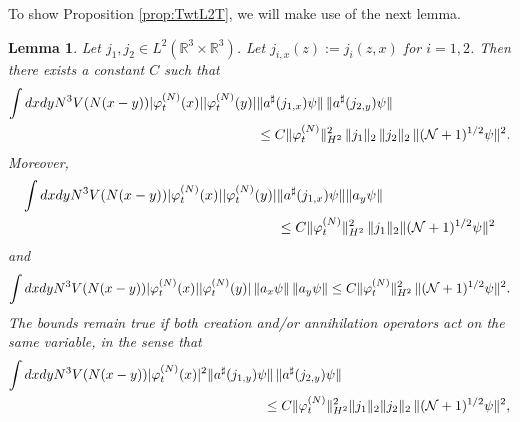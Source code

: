 \documentclass[11pt,a4paper]{article}
\newtheorem{lemma}[thm]{Lemma}
\newcommand{\bR}{{\mathbb R}}
\newcommand{\cN}{{\cal N}}
\begin{document}
To show Proposition \ref{prop:TwtL2T}, we will make use of the next lemma.
\begin{lemma}\label{lm:2b}
Let $j_1, j_2 \in L^2 (\bR^3 \times \bR^3)$. Let $j_{i,x} (z) := j_i (z,x)$ for $i=1,2$. Then there exists a constant $C$ such that 
\begin{equation}\label{eq:lm2b-1}  
\begin{split}
\int dx dy N^3 V(N (x-y)) |\varphi_t^{(N)} (x)| |\varphi_t^{(N)} (y)| & \| a^\sharp (j_{1,x}) \psi \| \, \| a^\sharp (j_{2,y}) \psi \| \\  &\leq C \| \varphi_t^{(N)} \|_{H^2}^2  \, \| j_1 \|_2 \, \| j_2 \|_2 \, \| (\cN+1)^{1/2} \psi \|^2. \end{split} \end{equation}
Moreover,  
\begin{equation}\label{eq:lm2b-2} 
\begin{split}
\int dx dy N^3 V(N (x-y)) |\varphi_t^{(N)} (x)| |\varphi_t^{(N)} (y)| &\| a^\sharp (j_{1,x}) \psi \|  \| a_y \psi \| \\&\leq C\| \varphi_t^{(N)} \|_{H^2}^2  \, \| j_1 \|_2 \| (\cN+1)^{1/2} \psi \|^2 \end{split} \end{equation}
and 
\begin{equation}\label{eq:lm2b-3}
\int dx dy N^3 V(N (x-y))   |\varphi_t^{(N)} (x)| |\varphi_t^{(N)} (y)|  \, \| a_x \psi \| \, \|  a_y  \psi \|  
\leq C \| \varphi_t^{(N)}\|_{H^2}^2  \,\| (\cN+1)^{1/2} \psi \|^2 .
\end{equation}
The bounds remain true if both creation and/or annihilation operators act on the same variable, in the sense that
\begin{equation}\label{eq:lm2b-4} \begin{split}
 \int dx dy N^3 V(N (x-y))&|\varphi_t^{(N)} (x)|^2 \| a^\sharp (j_{1,y})  \psi \| \, \|  a^\sharp (j_{2,y}) \psi \|  
 \\  &\hspace{3cm} \leq C\| \varphi_t^{(N)} \|_{H^2}^2 \|j_1 \|_2 \| j_2 \|_2 \, \| (\cN+1)^{1/2} \psi \|^2, \\

\end{split}
\end{equation}
\end{lemma}
\end{document}
